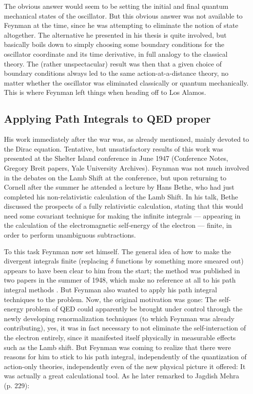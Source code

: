 \documentclass[12pt,a4paper]{article}
\begin{document}
The obvious answer would seem to be setting the initial and final quantum mechanical states of the oscillator. But this obvious answer was not available to Feynman at the time, since he was attempting to eliminate the notion of state altogether. The alternative he presented in his thesis is quite involved, but basically boils down to simply choosing some boundary conditions for the oscillator coordinate and its time derivative, in full analogy to the classical theory. The (rather unspectacular) result was then that a given choice of boundary conditions always led to the same action-at-a-distance theory, no matter whether the oscillator was eliminated classically or quantum mechanically. This is where Feynman left things when heading off to Los Alamos. 

\subsection{Applying Path Integrals to QED proper}

His work immediately after the war was, as already mentioned, mainly devoted to the Dirac equation. Tentative, but unsatisfactory results of this work was presented at the Shelter Island conference in June 1947 (Conference Notes, Gregory Breit papers, Yale University Archives). Feynman was not much involved in the debates on the Lamb Shift at the conference, but upon returning to Cornell after the summer he attended a lecture by Hans Bethe, who had just completed his non-relativistic calculation of the Lamb Shift. In his talk, Bethe discussed the prospects of a fully relativistic calculation, stating that this would need some covariant technique for making the infinite integrals --- appearing in the calculation of the electromagnetic self-energy of the electron --- finite, in order to perform unambiguous subtractions.

To this task Feynman now set himself. The general idea of how to make the divergent integrals finite (replacing $\delta$ functions by something more smeared out) appears to have been clear to him from the start; the method was published in two papers in the summer of 1948, which make no reference at all to his path integral methods \citep{feynman_1948_a-relativistic, feynman_1948_relativistic}. But Feynman also wanted to apply his path integral techniques to the problem. Now, the original motivation was gone: The self-energy problem of QED could apparently be brought under control through the newly developing renormalization techniques (to which Feynman was already contributing), yes, it was in fact necessary to not eliminate the self-interaction of the electron entirely, since it manifested itself physically in measurable effects such as the Lamb shift. But Feynman was coming to realize that there were reasons for him to stick to his path integral, independently of the quantization of action-only theories, independently even of the new physical picture it offered: It was actually a great calculational tool. As he later remarked to Jagdish Mehra (p. 229):
\end{document}
